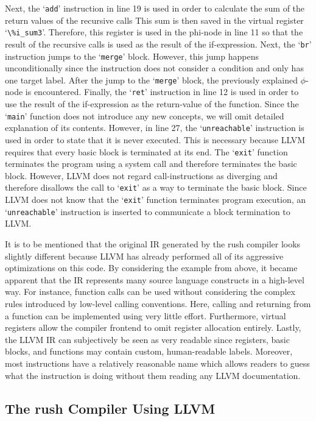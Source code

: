 Next, the `\texttt{add}' instruction in line 19 is used in order to calculate the sum of the return values of the recursive calls
This sum is then saved in the virtual register `\Verb|\%i_sum3|'.
Therefore, this register is used in the phi-node in line 11 so that the result of the recursive calls is used as the result of the if-expression.
Next, the `\texttt{br}' instruction jumps to the `\texttt{merge}' block.
However, this jump happens unconditionally since the instruction does not consider a condition and only has one target label.
After the jump to the `\texttt{merge}' block, the previously explained $\phi$-node is encountered.
Finally, the `\texttt{ret}' instruction in line 12 is used in order to use the result of the if-expression as the return-value of the function.
Since the `\texttt{main}' function does not introduce any new concepts, we will omit detailed explanation of its contents.
However, in line 27, the `\texttt{unreachable}' instruction is used in order to state that it is never executed.
This is necessary because LLVM requires that every basic block is terminated at its end.
The `\texttt{exit}' function terminates the program using a system call and therefore terminates the basic block.
However, LLVM does not regard call-instructions as diverging and therefore disallows the call to `\texttt{exit}' as a way to terminate the basic block.
Since LLVM does not know that the `\texttt{exit}' function terminates program execution, an `\texttt{unreachable}'  instruction is inserted to communicate a block termination to LLVM\@.

It is to be mentioned that the original IR generated by the rush compiler looks slightly different because LLVM has already performed all of its aggressive optimizations on this code.
By considering the example from above, it became apparent that the IR represents many source language constructs in a high-level way.
For instance, function calls can be used without considering the complex rules introduced by low-level calling conventions.
Here, calling and returning from a function can be implemented using very little effort.
Furthermore, virtual registers allow the compiler frontend to omit register allocation entirely.
Lastly, the LLVM IR can subjectively be seen as very readable since registers, basic blocks, and functions may contain custom, human-readable labels.
Moreover, most instructions have a relatively reasonable name which allows readers to guess what the instruction is doing without them reading any LLVM documentation.


\subsection{The rush Compiler Using LLVM}


